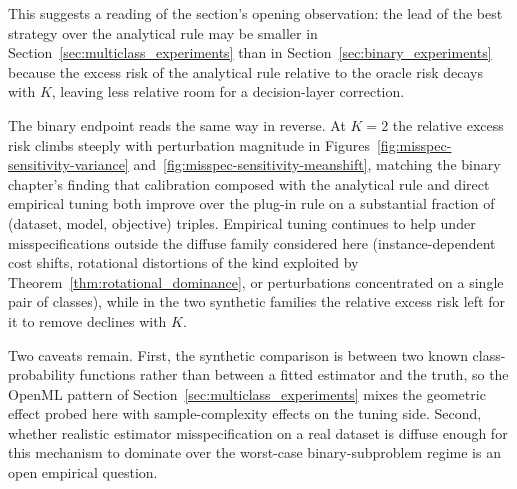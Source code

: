 This suggests a reading of the section's opening observation: the lead of the best strategy over the analytical rule may be smaller in Section~\ref{sec:multiclass_experiments} than in Section~\ref{sec:binary_experiments} because the excess risk of the analytical rule relative to the oracle risk decays with $K$, leaving less relative room for a decision-layer correction.

The binary endpoint reads the same way in reverse. At $K = 2$ the relative excess risk climbs steeply with perturbation magnitude in Figures~\ref{fig:misspec-sensitivity-variance} and~\ref{fig:misspec-sensitivity-meanshift}, matching the binary chapter's finding that calibration composed with the analytical rule and direct empirical tuning both improve over the plug-in rule on a substantial fraction of (dataset, model, objective) triples. Empirical tuning continues to help under misspecifications outside the diffuse family considered here (instance-dependent cost shifts, rotational distortions of the kind exploited by Theorem~\ref{thm:rotational_dominance}, or perturbations concentrated on a single pair of classes), while in the two synthetic families the relative excess risk left for it to remove declines with $K$.

Two caveats remain. First, the synthetic comparison is between two known class-probability functions rather than between a fitted estimator and the truth, so the OpenML pattern of Section~\ref{sec:multiclass_experiments} mixes the geometric effect probed here with sample-complexity effects on the tuning side. Second, whether realistic estimator misspecification on a real dataset is diffuse enough for this mechanism to dominate over the worst-case binary-subproblem regime is an open empirical question.
